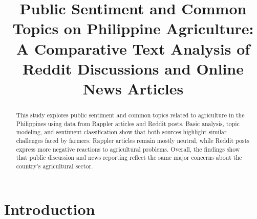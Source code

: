 \documentclass[conference]{IEEEtran}
\begin{document}
\title{Public Sentiment and Common Topics on Philippine Agriculture: A Comparative Text Analysis of Reddit Discussions and Online News Articles\\}

\author{
}

\maketitle


\begin{abstract}
This study explores public sentiment and common topics related to agriculture in the 
Philippines using data from Rappler articles and Reddit posts. Basic analysis, topic 
modeling, and sentiment classification show that both sources highlight similar challenges faced by farmers. 
Rappler articles remain mostly neutral, while Reddit posts express more negative reactions to agricultural 
problems. Overall, the findings show that public discussion and news reporting reflect the 
same major concerns about the country's agricultural sector.
\end{abstract}



\section{Introduction}
\end{document}
